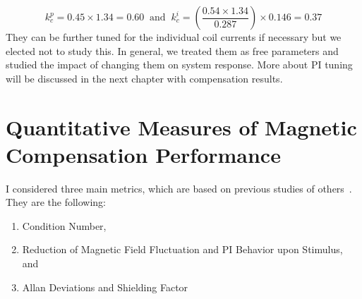 \begin{equation}
    k_c^p=0.45\times1.34=0.60\;\;\text{and}\;\; k_c^i=\left(\frac{0.54 \times1.34}{0.287}\right)\times0.146=0.37
\end{equation}
They can be further tuned for the individual coil currents if necessary but we elected not to study this. In general, we treated them as free parameters and studied the impact of changing them on system response. More about PI tuning will be discussed in the next chapter with compensation results.








 
 
% 





\section{Quantitative Measures of Magnetic Compensation Performance\label{sec:metrics}}
I considered three main metrics, which are based on previous studies of others~\cite{bea,lins,rawlik}. They are the following:

\begin{enumerate}
    \item Condition Number,
    \item Reduction of Magnetic Field Fluctuation and PI Behavior upon Stimulus, and
    \item Allan Deviations and Shielding Factor
\end{enumerate}

